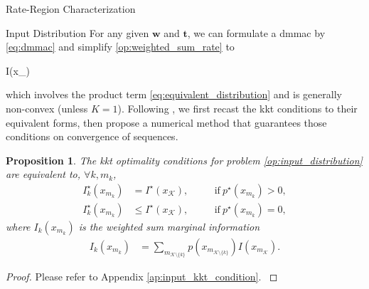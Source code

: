 \documentclass[journal]{IEEEtran}
\newtheorem{proposition}{Proposition}
\begin{document}
\begin{section}{Rate-Region Characterization}
	\begin{subsection}{Input Distribution}
		For any given $\boldsymbol{w}$ and $\boldsymbol{t}$, we can formulate a \gls{dmmac} by \eqref{eq:dmmac} and simplify \eqref{op:weighted_sum_rate} to
		\begin{maxi!}
			{}{I(x_{})}{\label{op:input_distribution}}{}
			\addConstraint{\eqref{co:sum_probability},\eqref{co:nonnegative_probability},}
		\end{maxi!}
		which involves the product term \eqref{eq:equivalent_distribution} and is generally non-convex (unless $K=1$).
		Following \cite{Rezaeian2004}, we first recast the \gls{kkt} conditions to their equivalent forms, then propose a numerical method that guarantees those conditions on convergence of sequences.
		\begin{proposition}
			The \gls{kkt} optimality conditions for problem \eqref{op:input_distribution} are equivalent to, $\forall k,m_k$,
			\begin{subequations}
				\label{eq:input_kkt_condition}
				\begin{alignat}{2}
					I_k^\star(x_{m_k}) & = I^\star(x_{\mathcal{K}}), \quad   &  & \text{if} \ p^\star(x_{m_k}) > 0,\label{eq:probable_states} \\
					I_k^\star(x_{m_k}) & \le I^\star(x_{\mathcal{K}}), \quad &  & \text{if} \ p^\star(x_{m_k}) = 0,\label{eq:dropped_states}
				\end{alignat}
			\end{subequations}
			where $I_k(x_{m_k})$ is the weighted sum marginal information
			\begin{align}
				I_k(x_{m_k})
				 & = \sum_{m_{\mathcal{K} \setminus \{k\}}} p(x_{m_{\mathcal{K} \setminus \{k\}}}) I(x_{m_\mathcal{K}}).
				\label{eq:weighted_sum_marginal_information}
			\end{align}
			\label{pr:input_kkt_condition}
		\end{proposition}

		\begin{proof}
			Please refer to Appendix \ref{ap:input_kkt_condition}.
			\label{pf:input_kkt_condition}
		\end{proof}


\end{subsection}
\end{section}
\end{document}

